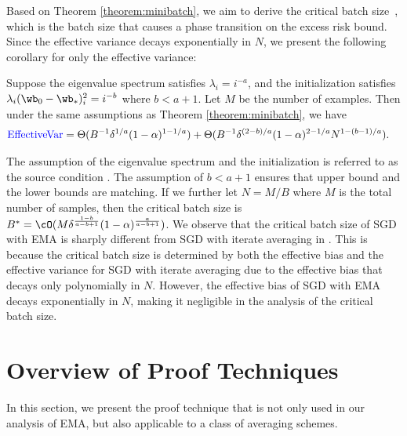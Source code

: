 \documentclass[11pt]{article}
\begin{document}
Based on Theorem \ref{theorem:minibatch}, we aim to derive the critical batch size~\citep{zhang2024does}, which is the batch size that causes a phase transition on the excess risk bound. Since the effective variance decays exponentially in $N$, we present the following corollary for only the effective variance:
\begin{corollary}\label{corollary:special_spectrum}
Suppose the eigenvalue spectrum satisfies $\lambda_i=i^{-a}$, and the initialization satisfies $\lambda_i(\wb_0-\wb_*)_i^2=i^{-b}$ where $b<a+1$. Let $M$ be the number of examples. Then under the same assumptions as Theorem \ref{theorem:minibatch}, we have
\begin{align*}
&\textcolor{blue}{\mathrm{EffectiveVar}}=\Theta(B^{-1}\delta^{1/a}(1-\alpha)^{1-1/a})+\Theta(B^{-1}\delta^{(2-b)/a}(1-\alpha)^{2-1/a}N^{1-(b-1)/a}).
\end{align*}
\end{corollary}
The assumption of the eigenvalue spectrum and the initialization is referred to as the source condition \citep{caponnetto2007optimal, zhang2024does}.
The assumption of $b<a+1$ ensures that upper bound and the lower bounds are matching. If we further let $N=M/B$ where $M$ is the total number of samples, then the critical batch size is
$B^*=\cO(M\delta^{\frac{1-b}{a-b+1}}(1-\alpha)^{\frac{a}{a-b+1}})$.
We observe that the critical batch size of SGD with EMA is sharply different from SGD with iterate averaging in \citet{zhang2024does}. This is because the critical batch size is determined by both the effective bias and the effective variance for SGD with iterate averaging due to the effective bias that decays only polynomially in $N$. However, the effective bias of SGD with EMA decays exponentially in $N$, making it negligible in the analysis of the critical batch size.


\section{Overview of Proof Techniques}

In this section, we present the proof technique that is not only used in our analysis of EMA, but also applicable to a class of averaging schemes.
\end{document}
